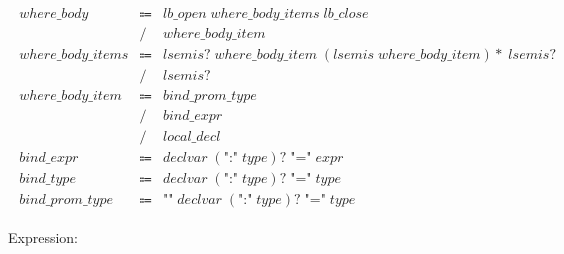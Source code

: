 \begin{align*}
    \begin{array}{rcll}
        \mathit{where\_body}
        &\Coloneq &\mathit{lb\_open}\; \mathit{where\_body\_items}\; \mathit{lb\_close} \\
        &\mathrel{/} &\mathit{where\_body\_item} \\
        \mathit{where\_body\_items}
        &\Coloneq &\mathit{lsemis}{?}\; \mathit{where\_body\_item}\; (\mathit{lsemis}\; \mathit{where\_body\_item}){*}\; \mathit{lsemis}{?} \\
        &\mathrel{/} &\mathit{lsemis}{?} \\
        \mathit{where\_body\_item}
        &\Coloneq &\mathit{bind\_prom\_type} \\
        &\mathrel{/} &\mathit{bind\_expr} \\
        &\mathrel{/} &\mathit{local\_decl} \\
        \mathit{bind\_expr}
        &\Coloneq &\mathit{declvar}\; (\texttt{":"}\; \mathit{type}){?}\; \texttt{"="}\; \mathit{expr} \\
        \mathit{bind\_type}
        &\Coloneq &\mathit{declvar}\; (\texttt{":"}\; \mathit{type}){?}\; \texttt{"="}\; \mathit{type} \\
        \mathit{bind\_prom\_type}
        &\Coloneq &\texttt{"\^{}"}\; \mathit{declvar}\; (\texttt{":"}\; \mathit{type}){?}\; \texttt{"="}\; \mathit{type}
    \end{array}
\end{align*}

Expression:

